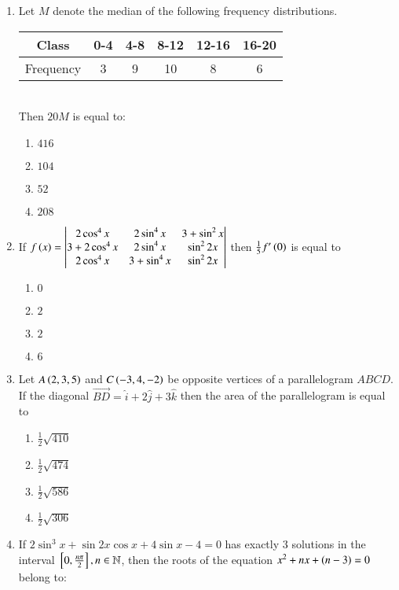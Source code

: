 \documentclass[journal]{IEEEtran}
\begin{document}
\begin{enumerate}
\item Let $M$ denote the median of the following frequency distributions.\\
	\begin{table}[h!]
		\centering
	\begin{tabular}{|c|c|c|c|c|c|}
\hline
Class & 0-4 & 4-8 & 8-12 & 12-16 & 16-20 \\ 
\hline
Frequency & 3 & 9 & 10 & 8 & 6 \\
\hline
\end{tabular}	
	\end{table}\\
	Then $20 M$ is equal to:
		\begin{enumerate}
	\item $416$
	\item $104$
	\item $52$
	\item $208$
		\end{enumerate}
	\item If $f\left(x\right) = \begin{vmatrix}2\cos^4x & 2\sin^4x & 3+\sin^2x \\ 3+2\cos^4x & 2\sin^4x & \sin^22x \\ 2\cos^4x & 3+\sin^4x & \sin^22x\end{vmatrix}$ then $\frac{1}{5}f^{\prime}\left(0\right)$ is equal to 
		\begin{enumerate}
			\item $0$
			\item $2$
			\item $2$
			\item $6$
		\end{enumerate}
	\item Let $A\left(2, 3, 5\right)$ and $C\left(-3, 4, -2\right)$ be opposite vertices of a parallelogram $ABCD$. If the diagonal $\overrightarrow{BD} = \hat{i}+2\hat{j}+3\hat{k}$ then the area of the parallelogram is equal to
		\begin{enumerate}
			\item $\frac{1}{2}\sqrt{410}$
			\item $\frac{1}{2}\sqrt{474}$
			\item $\frac{1}{2}\sqrt{586}$
			\item $\frac{1}{2}\sqrt{306}$
		\end{enumerate}
	\item If $2\sin^3x + \sin 2x \cos x + 4\sin x - 4 = 0$ has exactly $3$ solutions in the interval ${}\left[0,\frac{n\pi}{2}\right], n \in \mathbb{N}$, then the roots of the equation $x^2+nx+\left(n-3\right)=0$ belong to:
		\begin{enumerate}

\end{enumerate}
\end{enumerate}
\end{document}
